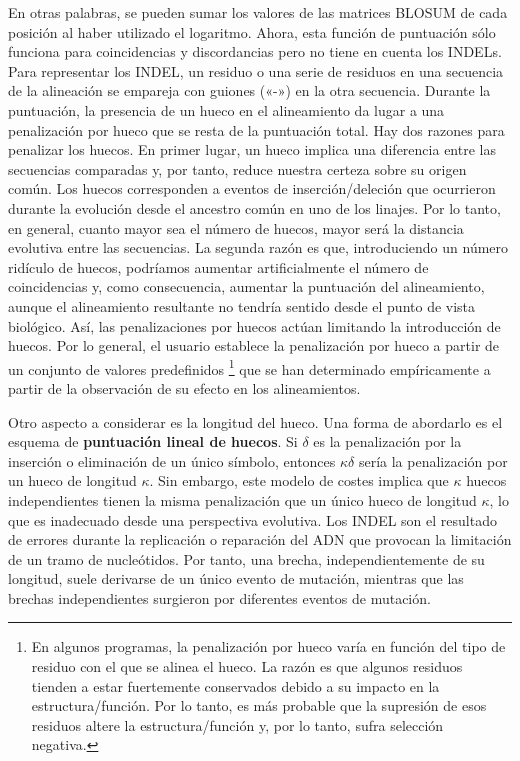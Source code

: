 En otras palabras, se pueden sumar los valores de las matrices BLOSUM de cada posición al haber utilizado el logaritmo. Ahora, esta función de puntuación sólo funciona para coincidencias y discordancias pero no tiene en cuenta los INDELs. Para representar los INDEL, un residuo o una serie de residuos en una secuencia de la alineación se empareja con guiones («-») en la otra secuencia. Durante la puntuación, la presencia de un hueco en el alineamiento da lugar a una penalización por hueco que se resta de la puntuación total. Hay dos razones para penalizar los huecos. En primer lugar, un hueco implica una diferencia entre las secuencias comparadas y, por tanto, reduce nuestra certeza sobre su origen común. Los huecos corresponden a eventos de inserción/deleción que ocurrieron durante la evolución desde el ancestro común en uno de los linajes. Por lo tanto, en general, cuanto mayor sea el número de huecos, mayor será la distancia evolutiva entre las secuencias. La segunda razón es que, introduciendo un número ridículo de huecos, podríamos aumentar artificialmente el número de coincidencias y, como consecuencia, aumentar la puntuación del alineamiento, aunque el alineamiento resultante no tendría sentido desde el punto de vista biológico. Así, las penalizaciones por huecos actúan limitando la introducción de huecos. Por lo general, el usuario establece la penalización por hueco a partir de un conjunto de valores predefinidos \footnote{En algunos programas, la penalización por hueco varía en función del tipo de residuo con el que se alinea el hueco. La razón es que algunos residuos tienden a estar fuertemente conservados debido a su impacto en la estructura/función. Por lo tanto, es más probable que la supresión de esos residuos altere la estructura/función y, por lo tanto, sufra selección negativa.} que se han determinado empíricamente a partir de la observación de su efecto en los alineamientos.

Otro aspecto a considerar es la longitud del hueco. Una forma de abordarlo es el esquema de \textbf{puntuación lineal de huecos}. Si $\delta$ es la penalización por la inserción o eliminación de un único símbolo, entonces $\kappa \delta$ sería la penalización por un hueco de longitud $\kappa$. Sin embargo, este modelo de costes implica que $\kappa$ huecos independientes tienen la misma penalización que un único hueco de longitud $\kappa$, lo que es inadecuado desde una perspectiva evolutiva. Los INDEL son el resultado de errores durante la replicación o reparación del ADN que provocan la limitación de un tramo de nucleótidos. Por tanto, una brecha, independientemente de su longitud, suele derivarse de un único evento de mutación, mientras que las brechas independientes surgieron por diferentes eventos de mutación.

